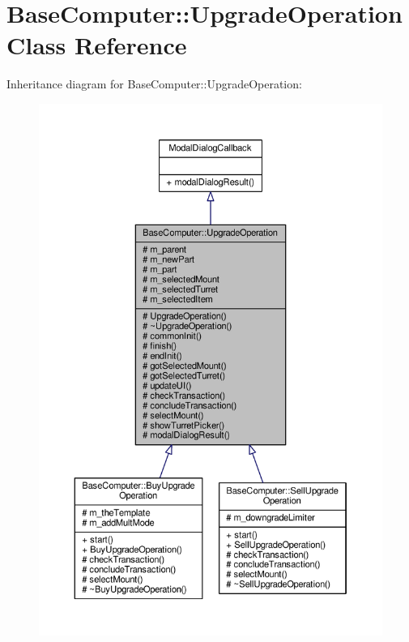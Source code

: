\hypertarget{classBaseComputer_1_1UpgradeOperation}{}\section{Base\+Computer\+:\+:Upgrade\+Operation Class Reference}
\label{classBaseComputer_1_1UpgradeOperation}


Inheritance diagram for Base\+Computer\+:\+:Upgrade\+Operation\+:
\nopagebreak
\begin{figure}[H]
\begin{center}
\leavevmode
\includegraphics[width=350pt]{d4/d53/classBaseComputer_1_1UpgradeOperation__inherit__graph}
\end{center}
\end{figure}


